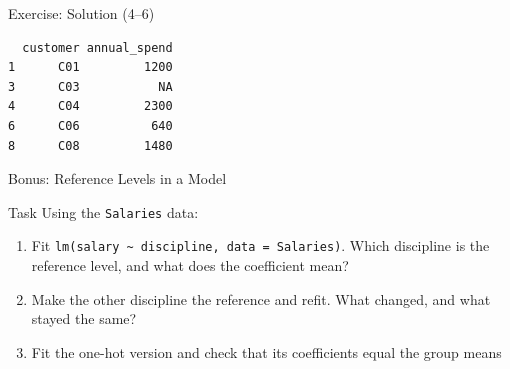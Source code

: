 \documentclass[
  ignorenonframetext,
  aspectratio=169,
]{beamer}
\newenvironment{Shaded}{\begin{snugshade}}{\end{snugshade}}
\newcommand{\AttributeTok}[1]{\textcolor[rgb]{0.40,0.45,0.13}{#1}}
\newcommand{\CommentTok}[1]{\textcolor[rgb]{0.37,0.37,0.37}{#1}}
\newcommand{\ConstantTok}[1]{\textcolor[rgb]{0.56,0.35,0.01}{#1}}
\newcommand{\DecValTok}[1]{\textcolor[rgb]{0.68,0.00,0.00}{#1}}
\newcommand{\FunctionTok}[1]{\textcolor[rgb]{0.28,0.35,0.67}{#1}}
\newcommand{\NormalTok}[1]{\textcolor[rgb]{0.00,0.23,0.31}{#1}}
\newcommand{\OtherTok}[1]{\textcolor[rgb]{0.00,0.23,0.31}{#1}}
\newcommand{\SpecialCharTok}[1]{\textcolor[rgb]{0.37,0.37,0.37}{#1}}
\newcommand{\StringTok}[1]{\textcolor[rgb]{0.13,0.47,0.30}{#1}}
\providecommand{\tightlist}{%
  \setlength{\itemsep}{0pt}\setlength{\parskip}{0pt}}\usepackage{longtable,booktabs,array}
\begin{document}
\begin{frame}[fragile]{Exercise: Solution (4--6)}
\protect\hypertarget{exercise-solution-46}{}
\begin{Shaded}
\end{Shaded}

\begingroup\tiny\color{darkgray}

\begin{verbatim}
  customer annual_spend
1      C01         1200
3      C03           NA
4      C04         2300
6      C06          640
8      C08         1480
\end{verbatim}

\endgroup
\end{frame}

\begin{frame}[fragile]{Bonus: Reference Levels in a Model}
\protect\hypertarget{bonus-reference-levels-in-a-model}{}
\begin{alertblock}{Task}
\protect\hypertarget{task-1}{}
Using the \texttt{Salaries} data:

\begin{enumerate}
\tightlist
\item
  Fit
  \texttt{lm(salary\ \textasciitilde{}\ discipline,\ data\ =\ Salaries)}.
  Which discipline is the reference level, and what does the coefficient
  mean?
\item
  Make the other discipline the reference and refit. What changed, and
  what stayed the same?
\item
  Fit the one-hot version and check that its coefficients equal the
  group means
\end{enumerate}
\end{alertblock}
\end{frame}
\end{document}
